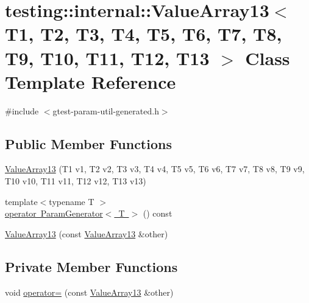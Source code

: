 \hypertarget{classtesting_1_1internal_1_1_value_array13}{}\section{testing\+::internal\+::Value\+Array13$<$ T1, T2, T3, T4, T5, T6, T7, T8, T9, T10, T11, T12, T13 $>$ Class Template Reference}
\label{classtesting_1_1internal_1_1_value_array13}


{\ttfamily \#include $<$gtest-\/param-\/util-\/generated.\+h$>$}

\subsection*{Public Member Functions}
\begin{DoxyCompactItemize}
\item 
\mbox{\hyperlink{classtesting_1_1internal_1_1_value_array13_a57505ac7a4fbb86f4121bf1d41b0352d}{Value\+Array13}} (T1 v1, T2 v2, T3 v3, T4 v4, T5 v5, T6 v6, T7 v7, T8 v8, T9 v9, T10 v10, T11 v11, T12 v12, T13 v13)
\item 
{\footnotesize template$<$typename T $>$ }\\\mbox{\hyperlink{classtesting_1_1internal_1_1_value_array13_a80572fc9c66a20824ae0934785b41f24}{operator Param\+Generator$<$ T $>$}} () const
\item 
\mbox{\hyperlink{classtesting_1_1internal_1_1_value_array13_a150575c5629d3a589bf2baba0371b1da}{Value\+Array13}} (const \mbox{\hyperlink{classtesting_1_1internal_1_1_value_array13}{Value\+Array13}} \&other)
\end{DoxyCompactItemize}
\subsection*{Private Member Functions}
\begin{DoxyCompactItemize}
\item 
void \mbox{\hyperlink{classtesting_1_1internal_1_1_value_array13_a27f6f2eef1fbeeeb65a23015e3c41044}{operator=}} (const \mbox{\hyperlink{classtesting_1_1internal_1_1_value_array13}{Value\+Array13}} \&other)
\end{DoxyCompactItemize}
